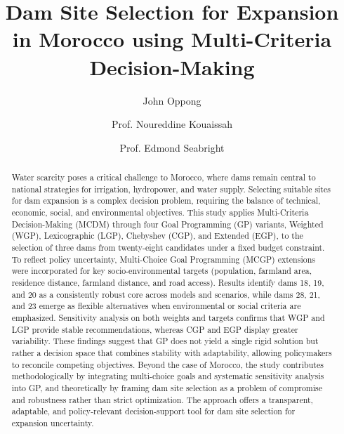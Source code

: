 \begin{frontmatter}

    \title{Dam Site Selection for Expansion in Morocco using Multi-Criteria Decision-Making}

    \author[opj]{John Oppong}
    \author[abs-supervisor]{Prof. Noureddine Kouaissah}
    \author[sci-supervisor]{Prof. Edmond Seabright}



\begin{abstract}
Water scarcity poses a critical challenge to Morocco, where dams remain central to national strategies for irrigation, hydropower, and water supply. Selecting suitable sites for dam expansion is a complex decision problem, requiring the balance of technical, economic, social, and environmental objectives. This study applies Multi-Criteria Decision-Making (MCDM) through four Goal Programming (GP) variants, Weighted (WGP), Lexicographic (LGP), Chebyshev (CGP), and Extended (EGP), to the selection of three dams from twenty-eight candidates under a fixed budget constraint. To reflect policy uncertainty, Multi-Choice Goal Programming (MCGP) extensions were incorporated for key socio-environmental targets (population, farmland area, residence distance, farmland distance, and road access). Results identify dams 18, 19, and 20 as a consistently robust core across models and scenarios, while dams 28, 21, and 23 emerge as flexible alternatives when environmental or social criteria are emphasized. Sensitivity analysis on both weights and targets confirms that WGP and LGP provide stable recommendations, whereas CGP and EGP display greater variability. These findings suggest that GP does not yield a single rigid solution but rather a decision space that combines stability with adaptability, allowing policymakers to reconcile competing objectives. Beyond the case of Morocco, the study contributes methodologically by integrating multi-choice goals and systematic sensitivity analysis into GP, and theoretically by framing dam site selection as a problem of compromise and robustness rather than strict optimization. The approach offers a transparent, adaptable, and policy-relevant decision-support tool for dam site selection for expansion uncertainty.    
\end{abstract}



\end{frontmatter}
